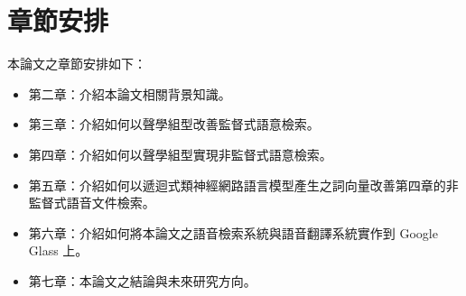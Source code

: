 \section{章節安排}
本論文之章節安排如下：

\begin{itemize}
\itemsep -2pt %
  \item  第二章：介紹本論文相關背景知識。
  \item  第三章：介紹如何以聲學組型改善監督式語意檢索。
  \item  第四章：介紹如何以聲學組型實現非監督式語意檢索。
  \item  第五章：介紹如何以遞迴式類神經網路語言模型產生之詞向量改善第四章的非監督式語音文件檢索。
  \item  第六章：介紹如何將本論文之語音檢索系統與語音翻譯系統實作到 Google Glass 上。
  \item  第七章：本論文之結論與未來研究方向。
\end{itemize}


